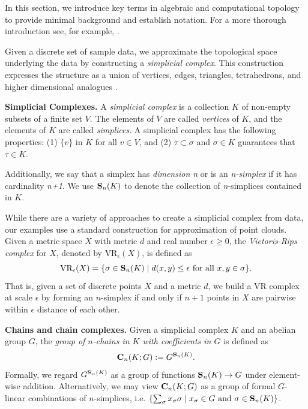 In this section, we introduce key terms in algebraic and computational topology to provide minimal background and establish notation. For a more thorough introduction see, for example, \cite{Carlsson2009TopologyAD, hatcher2002algebraic, edelsbrunner2010computational, barcodeGhrist, persistenthomologyasurvey,TZH15}. 
 
 
Given a discrete set of sample data, we approximate the topological space underlying the data by constructing a \textit{simplicial complex}. This construction expresses the structure as a union of vertices, edges, triangles, tetrahedrons, and higher dimensional analogues  \cite{Carlsson2009TopologyAD}.  



\noindent \textbf{Simplicial Complexes.} A \textit{simplicial complex} is a collection $K$ of non-empty subsets of a finite set $V$. The elements of $V$ are called \textit{vertices} of $K$, and the elements of $K$ are called \textit{simplices}. A simplicial complex has the following properties: (1) $\{v\}$ in $K$ for all $v \in V$, and (2) $\tau \subset \sigma$ and $\sigma \in K$ guarantees that $\tau \in K$. 


Additionally, we say that a simplex has \textit{dimension n} or is an \textit{n-simplex} if it has cardinality \textit{n+1}. We use $\mathbf{S}_n(K)$ to denote the collection of \textit{n}-simplices contained in $K$. 


While there are a variety of approaches to create a simplicial complex from data, our examples use a standard construction for approximation of point clouds.  Given a metric space $X$ with metric $d$ and real number $\epsilon \ge 0$, the \textit{Vietoris-Rips complex} for $X$, denoted by $\text{VR}_\epsilon(X)$, is defined as $$\text{VR}_\epsilon (X) = \{\sigma \in \mathbf{S}_n(K) \mid d(x,y) \leq  \epsilon \text{ for all } x, y \in \sigma\}.$$
That is, given a set of discrete points $X$ and a metric $d$, we build a VR complex at scale $\epsilon$ by forming an $n$-simplex if and only if $n+1$ points in $X$ are pairwise within $\epsilon$ distance of each other. 

\noindent \textbf{Chains and chain complexes.}
Given a simplicial complex $K$ and an abelian group  $G$, the \emph{group of $n$-chains in $K$ with coefficients in $G$} is defined as
%
    \begin{align*}
        \mathbf{C}_n(K; G) 
        :=
        G^{\mathbf{S}_n(K)}.
    \end{align*}
%    
Formally, we regard $G^{\mathbf{S}_n(K)}$ as a group of functions $\mathbf{S}_n(K) \to G$ under element-wise addition. Alternatively, we may view $\mathbf{C}_n(K; G)$ as a group of formal $G$-linear combinations of $n$-simplices, i.e. $\left \{\sum_{\sigma}x_{\sigma} \sigma \mid x_{\sigma} \in G \text{ and } \sigma \in \mathbf{S}_n(K) \right \}$.

